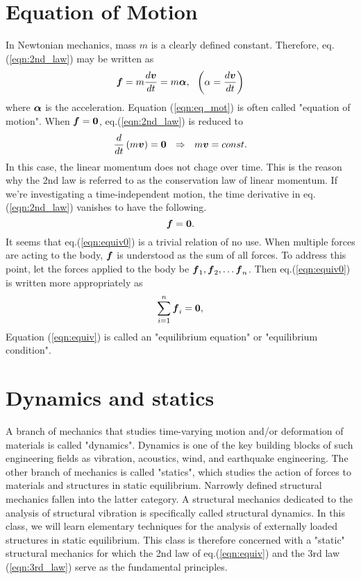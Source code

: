 \documentclass[10pt,a4j]{article}
\begin{document}
\section{Equation of Motion}
In Newtonian mechanics, mass $m$ is a clearly defined constant. 
Therefore, eq.(\ref{eqn:2nd_law}) may be written as 
\begin{equation}
    \fat{f}=m \frac{d\fat{v}}{dt}=m\fat{\alpha}, \ \ \left(\alpha=\frac{d\fat{v}}{dt}\right)
    \label{eqn:eq_mot}
\end{equation}
where $\mbox{\boldmath $\alpha$}$ is the acceleration. Equation (\ref{eqn:eq_mot}) is often called "equation of motion". When $\mbox{\boldmath $f$}=\mbox{\boldmath $0$}$, eq.(\ref{eqn:2nd_law}) is reduced to 
\begin{equation}
    \frac{d}{dt}\left(m\fat{v}\right)=\fat{0} \ \ \Rightarrow \ \ 
    m\fat{v}=const.
    \label{eqn:mv_cnst}
\end{equation}
In this case, the linear momentum does not chage over time. 
This is the reason why the 2nd law is referred to as the conservation law of linear momentum. 
If we're investigating a time-independent motion, the time derivative in eq.(\ref{eqn:2nd_law}) vanishes 
to have the following. 
\begin{equation}
    \mbox{\boldmath $f$}=\mbox{\boldmath $0$}.
    \label{eqn:equiv0}
\end{equation}
It seems that eq.(\ref{eqn:equiv0}) is a trivial relation of no use. 
When multiple forces are acting to the body, $\mbox{\boldmath $f$}$ is understood as the sum of all forces. 
To address this point, let the forces applied to the body be $\mbox{\boldmath $f$}_1, \mbox{\boldmath $f$}_2,\dots \mbox{\boldmath $f$}_n$. 
Then eq.(\ref{eqn:equiv0}) is written more appropriately as 
\begin{equation}
    \sum_{i=1}^n\mbox{\boldmath $f$}_i=\mbox{\boldmath $0$},
    \label{eqn:equiv}
\end{equation}
Equation (\ref{eqn:equiv}) is called an "equilibrium equation" or "equilibrium condition". 
\section{Dynamics and statics}
A branch of mechanics that studies time-varying motion and/or deformation of materials is called "dynamics". 
Dynamics is one of the key building blocks of such engineering fields as vibration, acoustics, wind, and earthquake engineering. 
The other branch of mechanics is called "statics", which studies the action of forces to materials and structures in static equilibrium. 
Narrowly defined structural mechanics fallen into the latter category. 
A structural mechanics dedicated to the analysis of structural vibration is specifically called structural dynamics. 
In this class, we will learn elementary techniques for the analysis of externally loaded structures 
in static equilibrium. This class is therefore concerned with a "static" structural mechanics for which the 2nd law of eq.(\ref{eqn:equiv})
 and the 3rd law (\ref{eqn:3rd_law}) serve as the fundamental principles.  
\end{document}
